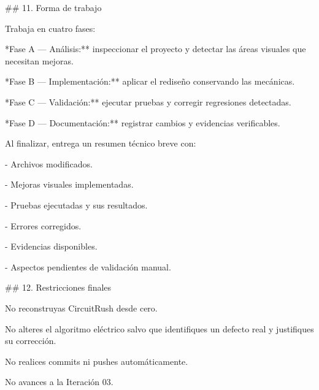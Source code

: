 \par\smallskip
\noindent \#\# 11. Forma de trabajo\par
\par\smallskip
\noindent Trabaja en cuatro fases:\par
\par\smallskip
\noindent **Fase A — Análisis:** inspeccionar el proyecto y detectar las áreas visuales que necesitan mejoras.\par
\par\smallskip
\noindent **Fase B — Implementación:** aplicar el rediseño conservando las mecánicas.\par
\par\smallskip
\noindent **Fase C — Validación:** ejecutar pruebas y corregir regresiones detectadas.\par
\par\smallskip
\noindent **Fase D — Documentación:** registrar cambios y evidencias verificables.\par
\par\smallskip
\noindent Al finalizar, entrega un resumen técnico breve con:\par
\par\smallskip
\noindent - Archivos modificados.\par
\noindent - Mejoras visuales implementadas.\par
\noindent - Pruebas ejecutadas y sus resultados.\par
\noindent - Errores corregidos.\par
\noindent - Evidencias disponibles.\par
\noindent - Aspectos pendientes de validación manual.\par
\par\smallskip
\noindent \#\# 12. Restricciones finales\par
\par\smallskip
\noindent No reconstruyas CircuitRush desde cero.\par
\par\smallskip
\noindent No alteres el algoritmo eléctrico salvo que identifiques un defecto real y justifiques su corrección.\par
\par\smallskip
\noindent No realices commits ni pushes automáticamente.\par
\par\smallskip
\noindent No avances a la Iteración 03.\par
\par\smallskip
